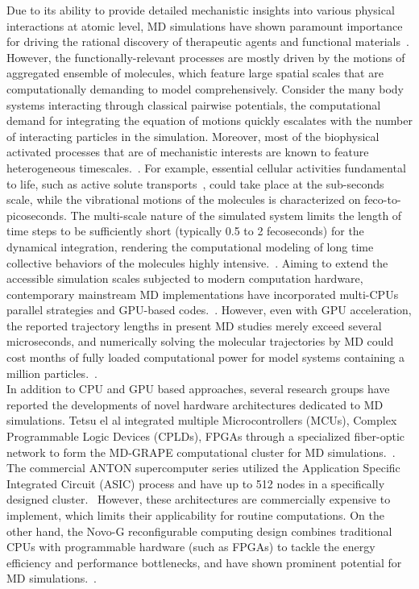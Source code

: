 \documentclass{article}
\begin{document}
\noindent
Due to its ability to provide detailed mechanistic insights into various 
physical interactions at atomic level, MD simulations have 
shown paramount importance for driving the rational discovery of therapeutic 
agents and functional 
materials~\cite{fep_runtong,fep_york,md_in_dd_jmc2016,md_in_material1}.
However, the functionally-relevant processes are mostly driven by the motions 
of aggregated ensemble of molecules, which feature large spatial scales that 
are computationally demanding to model comprehensively.
Consider the many body systems interacting through classical pairwise 
potentials, the computational demand for integrating the equation of motions 
quickly escalates with the number of interacting particles in the simulation.
Moreover, most of the biophysical activated processes that are of mechanistic 
interests are known to feature heterogeneous timescales.~\cite{Weinan}.
For example, essential cellular activities fundamental to life, such as active 
solute transports~\cite{PRXLife.2.043001}, could take place at the sub-seconds 
scale, while the vibrational motions of the molecules is characterized on 
feco-to-picoseconds. 
The multi-scale nature of the simulated system limits the length of time steps 
to be sufficiently short (typically 0.5 to 2 fecoseconds) for the dynamical 
integration, rendering the computational modeling of long time collective 
behaviors of the molecules highly intensive.~\cite{Kumar2022}.
Aiming to extend the accessible simulation scales subjected to modern 
computation hardware, contemporary mainstream MD implementations have 
incorporated multi-CPUs parallel strategies and GPU-based 
codes.~\cite{charmm_at_c45,amber_gpu2,namd_gpu,omm7,gmx}.
However, even with GPU acceleration, the reported trajectory lengths in 
present MD studies merely exceed several microseconds, and numerically solving 
the molecular trajectories by MD could cost months of fully loaded 
computational power for model systems containing a million particles.~\cite{doi:10.1021/acs.jctc.1c01214}.\\

\noindent
In addition to CPU and GPU based approaches, several research groups have 
reported the developments of novel hardware architectures dedicated to MD 
simulations. 
Tetsu el al integrated multiple Microcontrollers (MCUs), Complex Programmable 
Logic Devices (CPLDs), FPGAs through a specialized fiber-optic network to form 
the MD-GRAPE computational cluster for MD 
simulations.~\cite{MD-GRAPE-3,MDGRAPE-4A}.
The commercial ANTON supercomputer series utilized the Application Specific 
Integrated Circuit (ASIC) process and have up to 512 nodes in a specifically 
designed cluster.~\cite{anton1,anton2,anton3}
However, these architectures are commercially expensive to implement, which 
limits their applicability for routine computations.
On the other hand, the Novo-G reconfigurable computing design combines 
traditional CPUs with programmable hardware (such as FPGAs) to tackle the 
energy efficiency and performance bottlenecks, and have shown prominent 
potential for MD simulations.~\cite{Novo-G,Novo-G2}.\\
\end{document}
